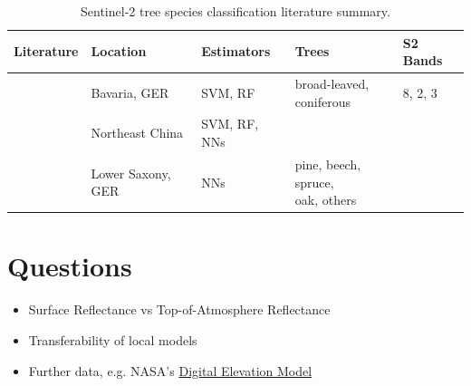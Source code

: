 \begin{table}[h!]
    \centering
    \caption{Sentinel-2 tree species classification literature summary.}
    \label{tab:_ex_tab}
    \begin{tabular}{lllll}     
        \toprule
        Literature             & Location          & Estimators   & Trees                    & S2 Bands \\
        \midrule
        \cite{germany_bavaria} & Bavaria, GER      & SVM, RF      & \makecell[l]{broad-leaved,\\ coniferous} & 8, 2, 3 \\
        \cite{china_northeast} & Northeast China   & SVM, RF, NNs & & \\
        \cite{copernicus_main} & Lower Saxony, GER & NNs          & \makecell[l]{pine, beech, spruce,\\ oak, others} & \\
        \bottomrule
    \end{tabular}
\end{table}

\section{Questions}

\begin{itemize}
    \item Surface Reflectance vs Top-of-Atmosphere Reflectance
    \item Transferability of local models
    \item Further data, e.g. NASA's \href{http://wiki.gis.com/wiki/index.php/Digital_Elevation_Model}{Digital Elevation Model}
\end{itemize}
